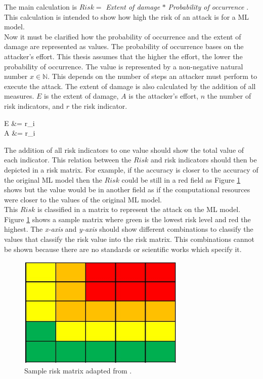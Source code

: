 The main calculation is $Risk = $ \textit{Extent of damage} $*$ \textit{Probability of occurrence} \cite{DBLP:journals/access/JianxingHSH21}. This calculation is intended to show how high the risk of an attack is for a ML model. \\
Now it must be clarified how the probability of occurrence and the extent of damage are represented as values. The probability of occurrence bases on the attacker's effort. This thesis assumes that the higher the effort, the lower the probability of occurrence. The value is represented by a non-negative natural number $x \in \mathbb{N}$. This depends on the number of steps an attacker must perform to execute the attack. The extent of damage is also calculated by the addition of all measures. $E$ is the extent of damage, $A$ is the attacker's effort, $n$ the number of risk indicators, and $r$ the risk indicator. \\

\begin{center}
  E &=  r_{i} \\
  A &=  r_{i} \\
\end{center}

The addition of all risk indicators to one value should show the total value of each indicator. This relation between the $Risk$ and risk indicators should then be depicted in a risk matrix. For example, if the accuracy is closer to the accuracy of the original ML model then the $Risk$ could be still in a red field as Figure \ref{fig:sample_matrix} shows but the value would be in another field as if the computational resources were closer to the values of the original ML model. \\
This $Risk$ is classified in a matrix to represent the attack on the ML model. Figure \ref{fig:sample_matrix} shows a sample matrix where green is the lowest risk level and red the highest. The \textit{x-axis} and \textit{y-axis} should show different combinations to classify the values that classify the risk value into the risk matrix. This combinations cannot be shown because there are no standards or scientific works which specify it.

\begin{figure}[ht!]
  \centering
  \includegraphics[width=8cm]{pictures/sample_matrix.jpg}
  \caption{Sample risk matrix adapted from \cite{Ivanenko2020IMPLEMENTATIONOR}.}
  \label{fig:sample_matrix}
\end{figure}

